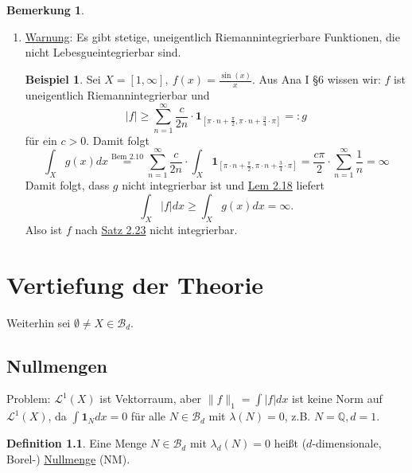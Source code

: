 \documentclass[a4paper]{report}
\newcommand{\doubleOne}{\textbf{1}}
\newcommand{\Q}{\mathbb{Q}}
\newcommand{\Borel}{\mathcal{B}}
\newcommand{\Bd}{\Borel_d}
\newcommand{\Leb}{\mathcal{L}}
\newcommand{\jlabel}[1]{\label{j_#1}}
\newcommand{\jhyperref}[2]{\hyperref[j_#1]{#2}}
\newcommand{\jlink}[1]{\jhyperref{#1}{#1}}
\theoremstyle{plain}
\theoremstyle{definition}
\newtheorem{defn}[thm]{Definition}
\newtheorem{bem}[thm]{Bemerkung}
\newtheorem*{expl*}{Beispiel}
\begin{document}
{{{{\begin{bem}
\begin{enumerate}
        \item
            \uline{Warnung}: Es gibt stetige, uneigentlich Riemannintegrierbare Funktionen, die nicht Lebesgueintegrierbar sind.
            \begin{expl*}
                Sei $X=[1,\infty], \ f(x) = \frac{\sin(x)}{x}$. Aus Ana I §6 wissen wir: $f$ ist uneigentlich Riemannintegrierbar und
                \begin{displaymath}
                    |f| \ge \sum_{n=1}^\infty \frac{c}{2n} \cdot \doubleOne_{[\pi\cdot n + \frac{\pi}{2}, \pi\cdot n + \frac{3}{4}\cdot \pi]} =: g
                \end{displaymath}
                für ein $c>0$. Damit folgt
                \begin{displaymath}
                    \int_X g(x) dx \overset{\text{Bem 2.10}}{=} \sum_{n=1}^\infty \frac{c}{2n} \cdot \int_X \doubleOne_{[\pi\cdot n + \frac{\pi}{2}, \pi\cdot n + \frac{3}{4}\cdot \pi]} = \frac{c\pi}{2} \cdot \sum_{n=1}^\infty \frac{1}{n} = \infty
                \end{displaymath}
                Damit folgt, dass $g$ nicht integrierbar ist und \jlink{Lem 2.18} liefert
                \begin{displaymath}
                    \int_X|f|dx \ge \int_X g(x)dx = \infty. 
                \end{displaymath}
                Also ist $f$ nach \jlink{Satz 2.23} nicht integrierbar.
            \end{expl*}

    \end{enumerate}
\end{bem}

\chapter{Vertiefung der Theorie}
    Weiterhin sei $\emptyset \ne X \in \Bd$.
    
\section{Nullmengen}

Problem: $\Leb^1(X)$ ist Vektorraum, aber $\lVert f \rVert_1 = \int |f|dx$ ist keine Norm auf $\Leb^1(X)$, da $\int \doubleOne_N dx = 0$ für alle $N \in \Bd$ mit $\lambda(N) = 0$, z.B. $N=\Q, d=1$.

\begin{defn}
\jlabel{Def 3.1}
    Eine Menge $N\in \Bd$ mit $\lambda_d(N) = 0$ heißt ($d$-dimensionale, Borel-) \uline{Nullmenge} (NM).
\end{defn}


}}}}
\end{document}
